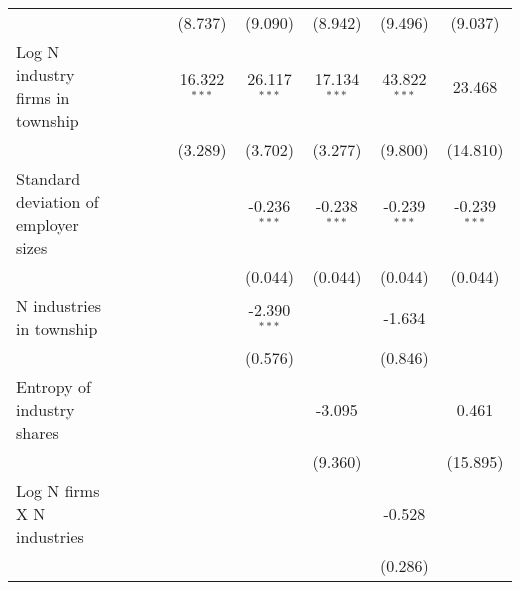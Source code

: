 \begin{tabular}{lcccccccc}
                                                         &                &                 &                 & (8.737)          & (9.090)         & (8.942)         & (9.496)         & (9.037)\\   
   Log N industry firms in township                      &                &                 &                 & 16.322$^{***}$   & 26.117$^{***}$  & 17.134$^{***}$  & 43.822$^{***}$  & 23.468\\   
                                                         &                &                 &                 & (3.289)          & (3.702)         & (3.277)         & (9.800)         & (14.810)\\   
   Standard deviation of employer sizes                  &                &                 &                 &                  & -0.236$^{***}$  & -0.238$^{***}$  & -0.239$^{***}$  & -0.239$^{***}$\\   
                                                         &                &                 &                 &                  & (0.044)         & (0.044)         & (0.044)         & (0.044)\\   
   N industries in township                              &                &                 &                 &                  & -2.390$^{***}$  &                 & -1.634          &   \\   
                                                         &                &                 &                 &                  & (0.576)         &                 & (0.846)         &   \\   
   Entropy of industry shares                            &                &                 &                 &                  &                 & -3.095          &                 & 0.461\\   
                                                         &                &                 &                 &                  &                 & (9.360)         &                 & (15.895)\\   
   Log N firms X N industries                            &                &                 &                 &                  &                 &                 & -0.528          &   \\   
                                                         &                &                 &                 &                  &                 &                 & (0.286)         &   \\   

\end{tabular}
